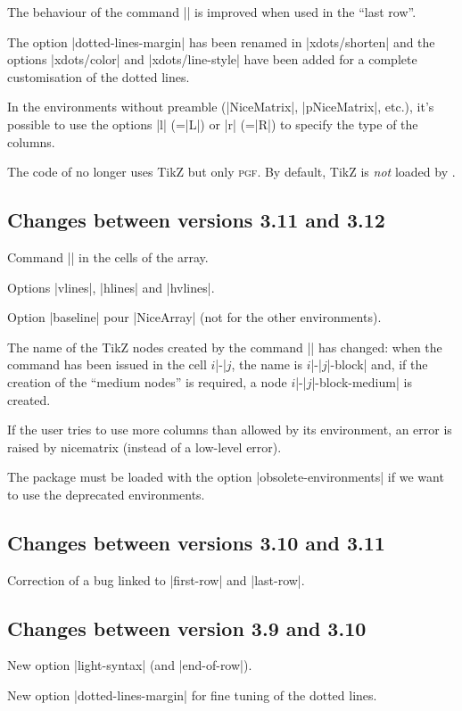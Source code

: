 \documentclass[dvipsnames]{article}%
\begin{document}
The behaviour of the command |\rotate| is improved when used in the ``last
row''.

The option |dotted-lines-margin| has been renamed in |xdots/shorten| and the
options |xdots/color| and |xdots/line-style| have been added for a complete
customisation of the dotted lines.

In the environments without preamble (|{NiceMatrix}|, |{pNiceMatrix}|, etc.),
it's possible to use the options |l| (=|L|) or |r| (=|R|) to specify the type
of the columns.

The code of  no longer uses TikZ but only \textsc{pgf}. By
default, TikZ is \emph{not} loaded by .

\subsection*{Changes between versions 3.11 and 3.12}

Command |\rotate| in the cells of the array.

Options |vlines|, |hlines| and |hvlines|.

Option |baseline| pour |{NiceArray}| (not for the other environments).

The name of the TikZ nodes created by the command |\Block| has changed: when
the command has been issued in the cell $i$|-|$j$, the name is
$i$|-|$j$|-block| and, if the creation of the ``medium nodes'' is required, a
node $i$|-|$j$|-block-medium| is created.

If the user tries to use more columns than allowed by its environment, an error
is raised by nicematrix (instead of a low-level error).

The package must be loaded with the option |obsolete-environments| if we want
to use the deprecated environments.

\subsection*{Changes between versions 3.10 and 3.11}

Correction of a bug linked to |first-row| and |last-row|.

\subsection*{Changes between version 3.9 and 3.10} 

New option |light-syntax| (and |end-of-row|).

New option |dotted-lines-margin| for fine tuning of the dotted lines.
\end{document}
